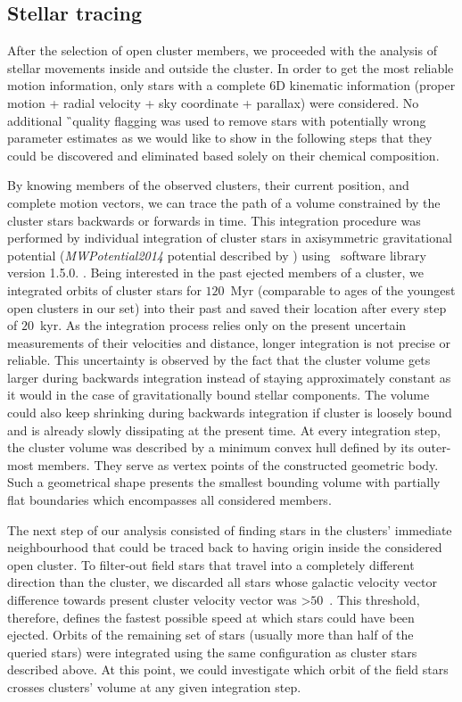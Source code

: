 \subsection{Stellar tracing}
\label{sec:orbit_tracing}
After the selection of open cluster members, we proceeded with the analysis of stellar movements inside and outside the cluster. In order to get the most reliable motion information, only stars with a complete 6D kinematic information (proper motion + radial velocity + sky coordinate + parallax) were considered. No additional \G\ quality flagging was used to remove stars with potentially wrong parameter estimates as we would like to show in the following steps that they could be discovered and eliminated based solely on their chemical composition.

By knowing members of the observed clusters, their current position, and complete motion vectors, we can trace the path of a volume constrained by the cluster stars backwards or forwards in time. This integration procedure was performed by individual integration of cluster stars in axisymmetric gravitational potential (\textit{MWPotential2014} potential described by \citet{2015ApJS..216...29B}) using \GP\ software library version 1.5.0. \cite{2015ApJS..216...29B}. Being interested in the past ejected members of a cluster, we integrated orbits of cluster stars for $120$~Myr (comparable to ages of the youngest open clusters in our set) into their past and saved their location after every step of $20$~kyr. As the integration process relies only on the present uncertain measurements of their velocities and distance, longer integration is not precise or reliable. This uncertainty is observed by the fact that the cluster volume gets larger during backwards integration instead of staying approximately constant as it would in the case of gravitationally bound stellar components. The volume could also keep shrinking during backwards integration if cluster is loosely bound and is already slowly dissipating at the present time. At every integration step, the cluster volume was described by a minimum convex hull defined by its outer-most members. They serve as vertex points of the constructed geometric body. Such a geometrical shape presents the smallest bounding volume with partially flat boundaries which encompasses all considered members.

The next step of our analysis consisted of finding stars in the clusters' immediate neighbourhood that could be traced back to having origin inside the considered open cluster. To filter-out field stars that travel into a completely different direction than the cluster, we discarded all stars whose galactic velocity vector difference towards present cluster velocity vector was >$50$~\kms. This threshold, therefore, defines the fastest possible speed at which stars could have been ejected. Orbits of the remaining set of stars (usually more than half of the queried stars) were integrated using the same configuration as cluster stars described above. At this point, we could investigate which orbit of the field stars crosses clusters' volume at any given integration step.


